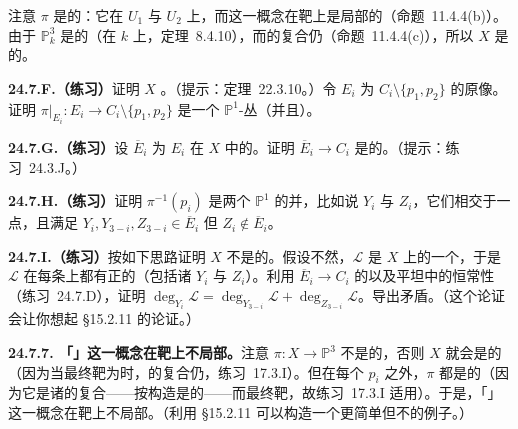 注意 $\pi$ 是\trProper{}的：它在 $U_1$ 与 $U_2$ 上\trProper，而\trProperness{}这一概念在靶上是局部的（\mbox{命题~11.4.4}(b)）。由于 $\mathbb{P}^3_k$ 是\trProper{}的（在 $k$ 上，\mbox{定理~8.4.10}），而\trProper{}\trMorphism{}的复合仍\trProper（\mbox{命题~11.4.4}(c)），所以 $X$ 是\trProper{}的。

\textbf{24.7.F.（练习）}\quad 证明 $X$ \trSmooth。（提示：\mbox{定理~22.3.10}。）令 $E_i$ 为 $C_i\setminus\{p_1,p_2\}$ 的原像。证明 $\pi|_{E_i}\colon E_i\to C_i\setminus\{p_1,p_2\}$ 是一个 $\mathbb{P}^1$-丛（并且\trFlat）。

\textbf{24.7.G.（练习）}\quad 设 $\overline{E}_i$ 为 $E_i$ 在 $X$ 中的\trClosure。证明 $\overline{E}_i\to C_i$ 是\trFlat{}的。（提示：\mbox{练习~24.3.J}。）

\textbf{24.7.H.（练习）}\quad 证明 $\pi^{-1}(p_i)$ 是两个 $\mathbb{P}^1$ 的并，比如说 $Y_i$ 与 $Z_i$，它们相交于一点，且满足 $Y_i,Y_{3-i},Z_{3-i}\in\overline{E}_i$ 但 $Z_i\notin\overline{E}_i$。

\textbf{24.7.I.（练习）}\quad 按如下思路证明 $X$ 不是\trProjective{}的。假设不然，$\mathscr{L}$ 是 $X$ 上的一个\trVeryAmple{}\trLineBundle，于是 $\mathscr{L}$ 在每条\trCurve{}上都有正的\trDegree（包括诸 $Y_i$ 与 $Z_i$）。利用 $\overline{E}_i\to C_i$ 的\trFlatness{}以及平坦\trFamily{}中\trDegree{}的恒常性（\mbox{练习~24.7.D}），证明 $\deg_{Y_i}\mathscr{L}=\deg_{Y_{3-i}}\mathscr{L}+\deg_{Z_{3-i}}\mathscr{L}$。导出矛盾。（这个论证会让你想起 \S15.2.11 的论证。）

\textbf{24.7.7. 「\trProjective{}\trMorphism」这一概念在靶上不局部。}\quad 注意 $\pi\colon X\to\mathbb{P}^3$ 不是\trProjective{}的，否则 $X$ 就会是\trProjective{}的（因为当最终靶为\trQuasicompact{}时，\trProjective{}\trMorphism{}的复合仍\trProjective，\mbox{练习~17.3.I}）。但在每个 $p_i$ 之外，$\pi$ 都是\trProjective{}的（因为它是诸\trBlowup{}的复合——\trBlowup{}按构造是\trProjective{}的——而最终靶\trQuasicompact，故\mbox{练习~17.3.I} 适用）。于是，「\trProjective{}\trMorphism」这一概念在靶上不局部。（利用 \S15.2.11 可以构造一个更简单但不\trSmooth{}的例子。）

